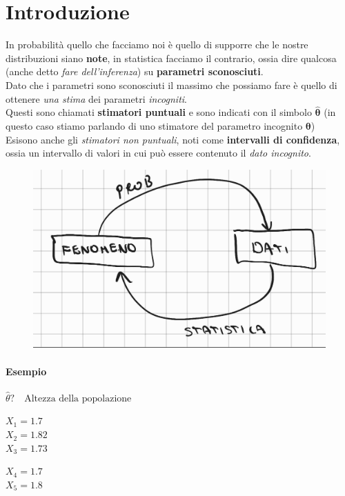 \documentclass[]{article}
\begin{document}
    \tableofcontents
    \newpage 
    \section{Introduzione}
    In probabilità quello che facciamo noi è quello di supporre che le nostre distribuzioni siano \textbf{note}, in statistica facciamo il contrario, ossia dire qualcosa (anche detto \textit{fare dell'inferenza}) su \textbf{parametri sconosciuti}. \\
    Dato che i parametri sono sconosciuti il massimo che possiamo fare è quello di ottenere \textit{una stima} dei parametri \textit{incogniti}. \\[2ex]
    Questi sono chiamati \textbf{stimatori puntuali} e sono indicati con il simbolo $\boldsymbol{\hat{\theta}}$ (in questo caso stiamo parlando di uno stimatore del parametro incognito $\boldsymbol{\theta}$) \\[2ex]
    Esisono anche gli \textit{stimatori non puntuali}, noti come \textbf{intervalli di confidenza}, ossia un intervallo di valori in cui può essere contenuto il \textit{dato incognito}.
    \begin{figure}[H]
        \includegraphics[width=\textwidth]{images/boh_15.jpg}
    \end{figure}
    \paragraph{Esempio} $\hat{\theta}? \quad \text{Altezza della popolazione}$ \\[2ex]
    \begin{minipage}{0.49\textwidth}
        $X_1 = 1.7$ \\
        $X_2 = 1.82$ \\
        $X_3 = 1.73$
    \end{minipage}
    \begin{minipage}{0.49\textwidth}
        $X_4 = 1.7$ \\
        $X_5 = 1.8$ \\
    \end{minipage}
\end{document}
